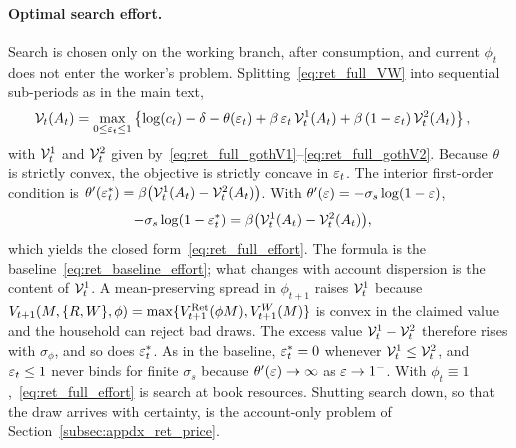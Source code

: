 \paragraph{Optimal search effort.}
Search is chosen only on the working branch, after consumption, and current $\phi_t$ does not enter the worker's problem. Splitting~\eqref{eq:ret_full_VW} into sequential sub-periods as in the main text,
\begin{align}
	\mathcal{V}_t(A_t)
	&= \max_{0\le\varepsilon_t\le 1}
	\left\{
		\log(c_t)-\delta-\theta(\varepsilon_t)
		+\beta\,\varepsilon_t\,\mathcal{V}_t^{1}(A_t)
		+\beta\,(1-\varepsilon_t)\,\mathcal{V}_t^{2}(A_t)
	\right\},
	\label{eq:ret_full_gothV}
\end{align}
with $\mathcal{V}_t^{1}$ and $\mathcal{V}_t^{2}$ given by~\eqref{eq:ret_full_gothV1}--\eqref{eq:ret_full_gothV2}. Because $\theta$ is strictly convex, the objective is strictly concave in $\varepsilon_t$. The interior first-order condition is $\theta'(\varepsilon_t^{\ast})=\beta\bigl(\mathcal{V}_t^{1}(A_t)-\mathcal{V}_t^{2}(A_t)\bigr)$. With $\theta'(\varepsilon)=-\sigma_s\log(1-\varepsilon)$,
\begin{align}
	-\sigma_s\log(1-\varepsilon_t^{\ast})
	&= \beta\bigl(\mathcal{V}_t^{1}(A_t)-\mathcal{V}_t^{2}(A_t)\bigr),
\end{align}
which yields the closed form~\eqref{eq:ret_full_effort}. The formula is the baseline~\eqref{eq:ret_baseline_effort}; what changes with account dispersion is the content of $\mathcal{V}_t^{1}$. A mean-preserving spread in $\phi_{t+1}$ raises $\mathcal{V}_t^{1}$ because $V_{t+1}(M,\{R,W\},\phi)=\max\{V_{t+1}^{\mathrm{Ret}}(\phi M),V_{t+1}^{W}(M)\}$ is convex in the claimed value and the household can reject bad draws. The excess value $\mathcal{V}_t^{1}-\mathcal{V}_t^{2}$ therefore rises with $\sigma_\phi$, and so does $\varepsilon_t^{\ast}$. As in the baseline, $\varepsilon_t^{\ast}=0$ whenever $\mathcal{V}_t^{1}\le\mathcal{V}_t^{2}$, and $\varepsilon_t\le 1$ never binds for finite $\sigma_s$ because $\theta'(\varepsilon)\to\infty$ as $\varepsilon\to 1^{-}$. With $\phi_t\equiv 1$,~\eqref{eq:ret_full_effort} is search at book resources. Shutting search down, so that the draw arrives with certainty, is the account-only problem of Section~\ref{subsec:appdx_ret_price}.

